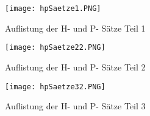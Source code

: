 \begin{figure}[H]
    \centering
    \texttt{[image: hpSaetze1.PNG]}
    \caption*{Auflistung der H- und P- Sätze Teil 1 \cite{baua}}
    \label{fig:hpsaetze1}
\end{figure}

\begin{figure}[H]
    \centering
    \texttt{[image: hpSaetze22.PNG]}
    \caption*{Auflistung der H- und P- Sätze Teil 2 \cite{baua}}
    \label{fig:hpsaetze2}
\end{figure}

\begin{figure}[H]
    \centering
    \texttt{[image: hpSaetze32.PNG]}
    \caption*{Auflistung der H- und P- Sätze Teil 3 \cite{baua}}
    \label{fig:hpsaetze3}
\end{figure}
